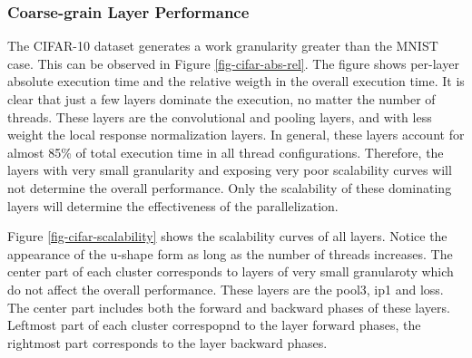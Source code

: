 \subsubsection{Coarse-grain Layer Performance}
The CIFAR-10 dataset generates a work granularity greater than 
the MNIST case. This can be observed in Figure \ref{fig-cifar-abs-rel}. 
The figure shows per-layer absolute execution time and the relative 
weigth in the overall execution time. It is clear that just a few 
layers dominate the execution, no matter the number of threads. 
These layers are the convolutional and pooling layers, and with 
less weight the local response normalization layers. In general, 
these layers account for almost 85\% of total execution time in 
all thread configurations. Therefore, the layers with very small 
granularity and exposing very poor scalability curves will not 
determine the overall performance. Only the scalability of these 
dominating layers will determine the effectiveness of the 
parallelization.

Figure \ref{fig-cifar-scalability} shows the scalability curves of all layers. 
Notice the appearance of the u-shape form as long as the number of threads 
increases. The center part of each cluster corresponds to layers of very 
small granularoty which do not affect the overall performance. These layers 
are the pool3, ip1 and loss. The center part includes both the forward 
and backward phases of these layers. Leftmost part of each cluster 
correspopnd to the layer forward phases, the rightmost part corresponds 
to the layer backward phases.

